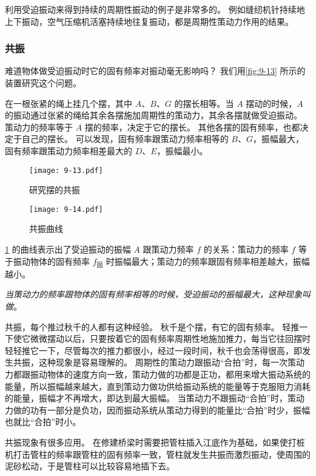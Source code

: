 \medskip
利用受迫振动来得到持续的周期性振动的例子是非常多的。
例如缝纫机针持续地上下振动，空气压缩机活塞持续地往复振动，都是周期性策动力作用的结果。

\subsubsection{共振}
难道物体做受迫振动时它的固有频率对振动毫无影响吗？
我们用\cref{fig:9-13} 所示的装置研究这个问题。

在一根张紧的绳上挂几个摆，其中 $A$、$B$、$G$ 的摆长相等。当 $A$ 摆动的时候，$A$ 的振动通过张紧的绳给其余各摆施加周期性的策动力，其余各摆就做受迫振动。
策动力的频率等于 $A$ 摆的频率，决定于它的摆长。
其他各摆的固有频率，也都决定于自己的摆长。
可以发现，固有频率跟策动力频率相等的 $B$、$G$，振幅最大，固有频率跟策动力频率相差最大的 $D$、$E$，振幅最小。

\begin{figure}
  \begin{minipage}[b]{0.48\linewidth}
    \centering
	  \texttt{[image: 9-13.pdf]}
    \caption{研究摆的共振}\label{fig:9-13}
  \end{minipage}
  \begin{minipage}[b]{0.48\linewidth}
    \centering
    \texttt{[image: 9-14.pdf]}
    \caption{共振曲线}\label{fig:9-14}
  \end{minipage}
\end{figure}

\cref{fig:9-14} 的曲线表示出了受迫振动的振幅 $A$ 跟策动力频率 $f$ 的关系：策动力的频率 $f$ 等于振动物体的固有频率 $f_{\text{固}}$ 时振幅最大；策动力的频率跟固有频率相差越大，振幅越小。

\emph{当策动力的频率跟物体的固有频率相等的时候，受迫振动的振幅最大，这种现象叫做}。

共振，每个推过秋千的人都有这种经验。
秋千是个摆，有它的固有频率。
轻推一下使它微微摆动以后，只要按着它的固有频率周期性地施加推力，每当它往回摆时轻轻推它一下，尽管每次的推力都很小，经过一段时间，秋千也会荡得很高，即发生共振，这种现象是容易理解的。
周期性的策动力跟振动“合拍”时，每一次策动力都跟振动物体的速度方向一致，策动力做的功都是正功，都用来增大振动系统的能量，所以振幅越来越大，直到策动力做功供给振动系统的能量等于克服阻力消耗的能量，振幅才不再增大，即达到最大振幅。
当策动力不跟振动“合拍”时，策动力做的功有一部分是负功，因而振动系统从策动力得到的能量比“合拍”时少，振幅也就比“合拍”时小。

共振现象有很多应用。
在修建桥梁时需要把管柱插入江底作为基础，如果使打桩机打击管柱的频率跟管柱的固有频率一致，管柱就发生共振而激烈振动，使周围的泥砂松动，于是管柱可以比较容易地插下去。

